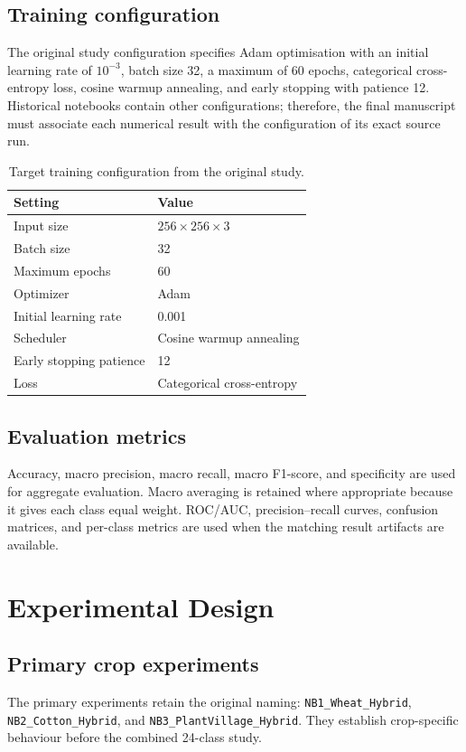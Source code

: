 \documentclass[a4paper,fleqn]{cas-dc}
\begin{document}
\subsection{Training configuration}
The original study configuration specifies Adam optimisation with an initial learning rate of $10^{-3}$, batch size 32, a maximum of 60 epochs, categorical cross-entropy loss, cosine warmup annealing, and early stopping with patience 12. Historical notebooks contain other configurations; therefore, the final manuscript must associate each numerical result with the configuration of its exact source run.

\begin{table}[t]
\centering
\caption{Target training configuration from the original study.}
\label{tab:hyper}
\small
\begin{tabular}{@{}ll@{}}
\toprule
Setting & Value \\
\midrule
Input size & $256\times256\times3$ \\
Batch size & 32 \\
Maximum epochs & 60 \\
Optimizer & Adam \\
Initial learning rate & 0.001 \\
Scheduler & Cosine warmup annealing \\
Early stopping patience & 12 \\
Loss & Categorical cross-entropy \\
\bottomrule
\end{tabular}
\end{table}

\subsection{Evaluation metrics}
Accuracy, macro precision, macro recall, macro F1-score, and specificity are used for aggregate evaluation. Macro averaging is retained where appropriate because it gives each class equal weight. ROC/AUC, precision--recall curves, confusion matrices, and per-class metrics are used when the matching result artifacts are available.

\section{Experimental Design}
\subsection{Primary crop experiments}
The primary experiments retain the original naming: \texttt{NB1\_Wheat\_Hybrid}, \texttt{NB2\_Cotton\_Hybrid}, and \texttt{NB3\_PlantVillage\_Hybrid}. They establish crop-specific behaviour before the combined 24-class study.
\end{document}
